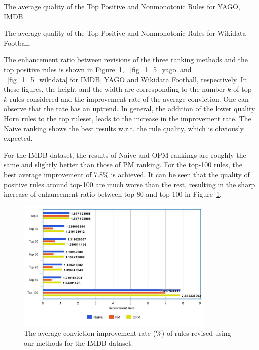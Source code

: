 \begin{table}[ht]
\centering
\footnotesize
\renewcommand*{\arraystretch}{1.07}
\centering

\smallskip
\caption{The average quality of the Top Positive and Nonmonotonic Rules for YAGO, IMDB.}
\label{tab:rules_quality1}
\end{table}

\begin{table}[ht]
\centering
\footnotesize
\renewcommand*{\arraystretch}{1.07}
\centering

\smallskip
\caption{The average quality of the Top Positive and Nonmonotonic Rules for Wikidata Football.}
\label{tab:rules_quality2}
\end{table}

The enhancement ratio between revisions of the three ranking methods and the top positive rules is shown in Figure~\ref{fig_1_5_imdb}, ~\ref{fig_1_5_yago} and ~\ref{fig_1_5_wikidata} for IMDB, YAGO and Wikidata Football, respectively. In these figures, the height and the width are corresponding to the number $k$ of top-$k$ rules considered and the improvement rate of the average conviction. One can observe that the rate has an uptrend. In general, the addition of the lower quality Horn rules to the top ruleset, leads to the increase in the improvement rate. The Naive ranking shows the best results w.r.t. the rule quality, which is obviously expected.

For the IMDB dataset, the results of Naive and OPM rankings are roughly the same and slightly better than those of PM ranking. For the top-100 rules, the best average improvement of 7.8\% is achieved. It can be seen that the quality of positive rules around top-100 are much worse than the rest, resulting in the sharp increase of enhancement ratio between top-80 and top-100 in Figure~\ref{fig_1_5_imdb}.

\begin{figure}[ht]
\centering
\includegraphics[width=0.85\textwidth]{figures/table_1_5_imdb.jpeg}
\caption{The average conviction improvement rate (\%) of rules revised using our methods for the IMDB dataset.}
\label{fig_1_5_imdb}
\end{figure}

